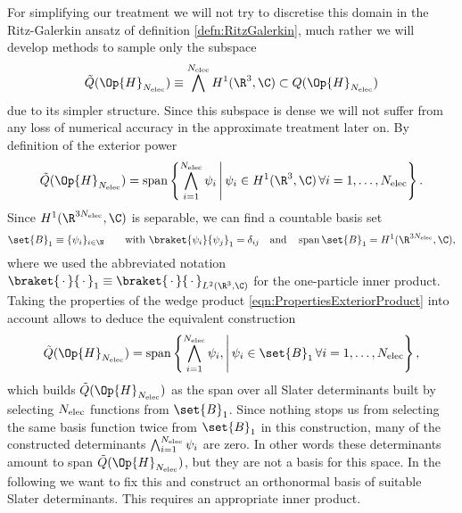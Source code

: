 For simplifying our treatment
we will not try to discretise this domain in the Ritz-Galerkin ansatz
of definition \ref{defn:RitzGalerkin},
much rather we will develop methods to sample only the subspace
\[ \tilde{Q}(\Op{H}_{\Nelec}) \equiv \bigwedge^{\Nelec} H^1(\R^3, \C) \subset Q(\Op{H}_{\Nelec}) \]
due to its simpler structure.
Since this subspace is dense we will not suffer from any loss of numerical
accuracy in the approximate treatment later on.
By definition of the exterior power
\begin{equation}
	\tilde{Q}(\Op{H}_{\Nelec}) = \spacespan \left\{
		\bigwedge_{i=1}^{\Nelec} \psi_i
		\, \middle| \,
		\psi_i \in H^1(\R^3, \C) \, \forall i = 1, \ldots, \Nelec
	\right\}.
	\label{eqn:FormDomainAllFunctions}
\end{equation}
Since $H^1(\R^{3\Nelec}, \C)$ is separable, we can find a countable basis set
\begin{equation}
	\set{B}_1 \equiv \{\psi_i\}_{i \in \N} \qquad \text{with }
	\braket{\psi_i}{\psi_j}_1 = \delta_{ij}
	\quad \text{and} \quad \spacespan \set{B}_1 = H^1(\R^{3\Nelec}, \C),
	\label{eqn:OneParticleBasis}
\end{equation}
where we used the abbreviated notation
$\braket{\slot}{\slot}_1 \equiv \braket{\slot}{\slot}_{L^2(\R^3, \C)}$
for the one-particle inner product.
Taking the properties of the wedge product \eqref{eqn:PropertiesExteriorProduct}
into account allows to deduce the equivalent construction
\begin{equation}
	\label{eqn:FormDomainSlaterDeterminants}
	\tilde{Q}(\Op{H}_{\Nelec}) = \spacespan
	\left\{ \bigwedge_{i=1}^{\Nelec} \psi_i
	, \middle| \, \psi_i \in \set{B}_1 \, \forall i=1,\ldots,\Nelec
	\right\},
\end{equation}
which builds $\tilde{Q}(\Op{H}_{\Nelec})$ as the span
over all Slater determinants built by selecting
$N_\text{elec}$ functions from $\set{B}_1$.
Since nothing stops us from selecting the same basis function
twice from $\set{B}_1$ in this construction,
many of the constructed determinants $\bigwedge_{i=1}^{N_\text{elec}} \psi_i$
are zero.
In other words these determinants amount to span $\tilde{Q}(\Op{H}_{\Nelec})$,
but they are not a basis for this space.
In the following we want to fix this and construct an orthonormal basis
of suitable Slater determinants.
This requires an appropriate inner product.
